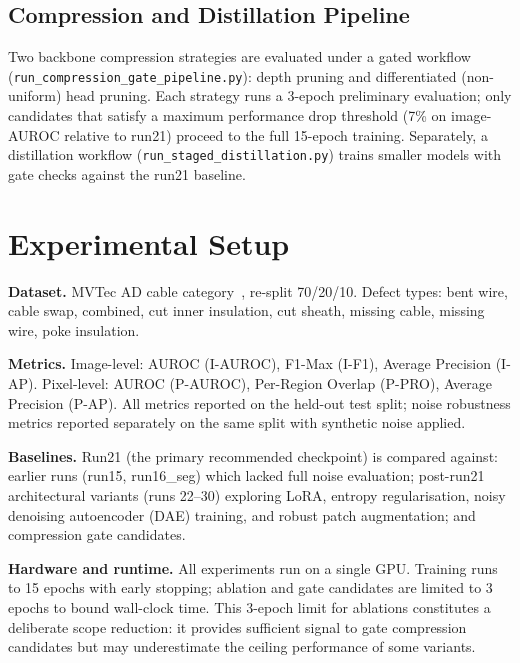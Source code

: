 \documentclass[11pt]{article}
\begin{document}
\subsection{Compression and Distillation Pipeline}

Two backbone compression strategies are evaluated under a gated workflow
(\texttt{run\_compression\_gate\_pipeline.py}): depth pruning and differentiated
(non-uniform) head pruning. Each strategy runs a 3-epoch preliminary evaluation;
only candidates that satisfy a maximum performance drop threshold (7\% on image-AUROC
relative to run21) proceed to the full 15-epoch training. Separately, a distillation workflow (\texttt{run\_staged\_distillation.py}) trains smaller models with gate checks against the run21 baseline.

\section{Experimental Setup}

\textbf{Dataset.} MVTec AD cable category~\cite{bergmann2019mvtec}, re-split 70/20/10.
Defect types: bent wire, cable swap, combined, cut inner insulation, cut sheath,
missing cable, missing wire, poke insulation.

\textbf{Metrics.} Image-level: AUROC (I-AUROC), F1-Max (I-F1), Average Precision
(I-AP). Pixel-level: AUROC (P-AUROC), Per-Region Overlap (P-PRO), Average Precision
(P-AP). All metrics reported on the held-out test split; noise robustness metrics
reported separately on the same split with synthetic noise applied.

\textbf{Baselines.} Run21 (the primary recommended checkpoint) is compared against:
earlier runs (run15, run16\_seg) which lacked full noise evaluation; post-run21
architectural variants (runs 22--30) exploring LoRA, entropy regularisation, noisy
denoising autoencoder (DAE) training, and robust patch augmentation; and
compression gate candidates.

\textbf{Hardware and runtime.} All experiments run on a single GPU. Training runs
to 15 epochs with early stopping; ablation and gate candidates are limited to
3 epochs to bound wall-clock time. This 3-epoch limit for ablations constitutes a
deliberate scope reduction: it provides sufficient signal to gate compression
candidates but may underestimate the ceiling performance of some variants.
\end{document}
